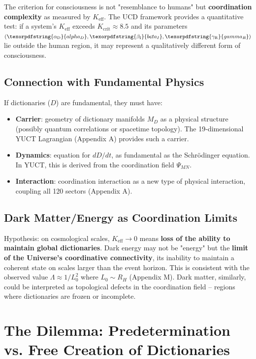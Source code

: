 \documentclass[12pt,a4paper]{article}
\DeclareRobustCommand{\alD}{\texorpdfstring{\ensuremath{\alpha_{\mathrm{D}}}}{alpha_D}}
\DeclareRobustCommand{\beI}{\texorpdfstring{\ensuremath{\beta_{\mathrm{I}}}}{beta_I}}
\DeclareRobustCommand{\gaR}{\texorpdfstring{\ensuremath{\gamma_{\mathrm{R}}}}{gamma_R}}
\newcommand{\eff}{\mathrm{eff}}
\newcommand{\Ke}{K_{\eff}}
\newcommand{\Kcrit}{K_{\mathrm{crit}}}
\begin{document}
	The criterion for consciousness is not "resemblance to humans" but \textbf{coordination complexity} as measured by $\Ke$. The UCD framework provides a quantitative test: if a system's $\Ke$ exceeds $\Kcrit \approx 8.5$ and its parameters $(\alD, \beI, \gaR)$ lie outside the human region, it may represent a qualitatively different form of consciousness.
	
	\subsection{Connection with Fundamental Physics}
	
	If dictionaries ($D$) are fundamental, they must have:
	\begin{itemize}
		\item \textbf{Carrier}: geometry of dictionary manifolds $M_D$ as a physical structure (possibly quantum correlations or spacetime topology). The 19‑dimensional YUCT Lagrangian (Appendix A) provides such a carrier.
		\item \textbf{Dynamics}: equation for $dD/dt$, as fundamental as the Schrödinger equation. In YUCT, this is derived from the coordination field $\Psi_{MN}$.
		\item \textbf{Interaction}: coordination interaction as a new type of physical interaction, coupling all 120 sectors (Appendix A).
	\end{itemize}
	
	\subsection{Dark Matter/Energy as Coordination Limits}
	
	Hypothesis: on cosmological scales, $\Ke \to 0$ means \textbf{loss of the ability to maintain global dictionaries}. Dark energy may not be "energy" but the \textbf{limit of the Universe's coordinative connectivity}, its inability to maintain a coherent state on scales larger than the event horizon. This is consistent with the observed value $\Lambda \approx 1/L_0^2$ where $L_0 \sim R_H$ (Appendix M). Dark matter, similarly, could be interpreted as topological defects in the coordination field – regions where dictionaries are frozen or incomplete.
	
	\section{The Dilemma: Predetermination vs. Free Creation of Dictionaries}
	
\end{document}
